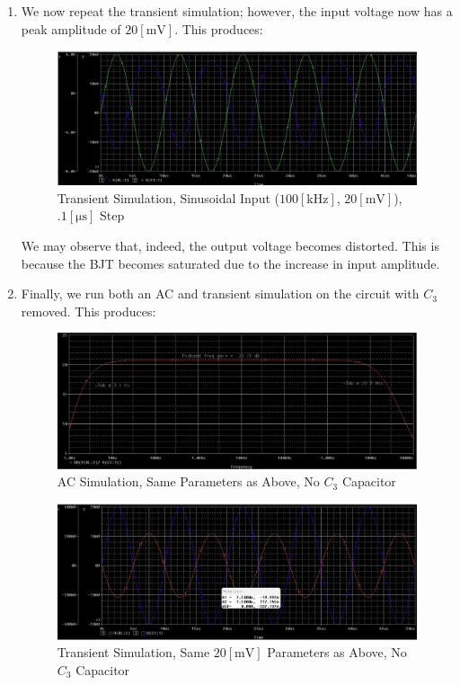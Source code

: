 \begin{enumerate}
\begin{enumerate}
      \item We now repeat the transient simulation; however, the input voltage now has a peak amplitude of $20[\si{\milli\volt}]$. This produces:

        \begin{figure}[H]
          \centering
          \includegraphics[width=.9\textwidth]{Figures/HW7-3d}
          \caption{Transient Simulation, Sinusoidal Input ($100[\si{\kilo\hertz}]$, $20[\si{\milli\volt}]$), $.1[\si{\micro\second}]$ Step}
          \label{fig:11}
        \end{figure}

        We may observe that, indeed, the output voltage becomes distorted. This is because the BJT becomes saturated due to the increase in input amplitude.

      \item Finally, we run both an AC and transient simulation on the circuit with $C_3$ removed. This produces:

        \begin{figure}[H]
          \centering
          \includegraphics[width=.9\textwidth]{Figures/HW7-3e1}
          \caption{AC Simulation, Same Parameters as Above, No $C_3$ Capacitor}
          \label{fig:12}
        \end{figure}

        \begin{figure}[H]
          \centering
          \includegraphics[width=.9\textwidth]{Figures/HW7-3e2}
          \caption{Transient Simulation, Same $20[\si{\milli\volt}]$ Parameters as Above, No $C_3$ Capacitor}
          \label{fig:13}
        \end{figure}


\end{enumerate}
\end{enumerate}
